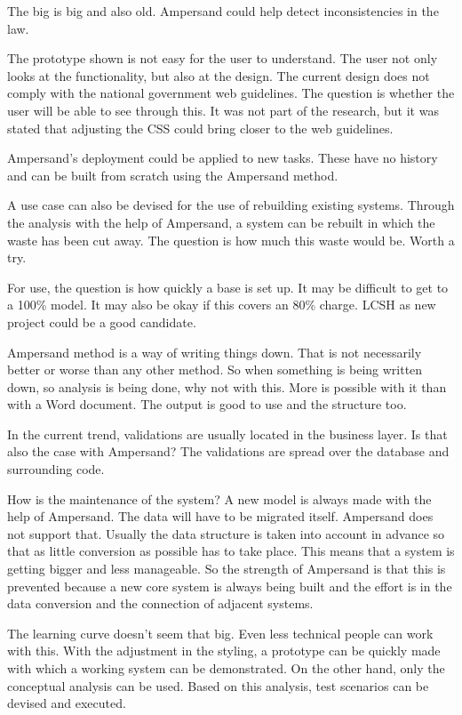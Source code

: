 The \acrshort{big} is big and also old. 
Ampersand could help detect inconsistencies in the law.

The prototype shown is not easy for the user to understand. 
The user not only looks at the functionality, but also at the design.
The current design does not comply with the national government web guidelines.
The question is whether the user will be able to see through this. 
It was not part of the research, but it was stated that adjusting the CSS could bring closer to the web guidelines.

Ampersand's deployment could be applied to new tasks. 
These have no history and can be built from scratch using the Ampersand method.

A use case can also be devised for the use of rebuilding existing systems. 
Through the analysis with the help of Ampersand, a system can be rebuilt in which the waste has been cut away. 
The question is how much this waste would be. Worth a try.

For use, the question is how quickly a base is set up. 
It may be difficult to get to a 100\% model. 
It may also be okay if this covers an 80\% charge.
LCSH as new project could be a good candidate.

Ampersand method is a way of writing things down. 
That is not necessarily better or worse than any other method. 
So when something is being written down, so analysis is being done, why not with this. 
More is possible with it than with a Word document. 
The output is good to use and the structure too.

In the current trend, validations are usually located in the business layer.
Is that also the case with Ampersand? 
The validations are spread over the database and surrounding code.

How is the maintenance of the system? 
A new model is always made with the help of Ampersand. 
The data will have to be migrated itself. 
Ampersand does not support that. 
Usually the data structure is taken into account in advance so that as little conversion as possible has to take place. 
This means that a system is getting bigger and less manageable. 
So the strength of Ampersand is that this is prevented because a new core system is always being built and the effort is in the data conversion and the connection of adjacent systems.

The learning curve doesn't seem that big. 
Even less technical people can work with this. 
With the adjustment in the styling, a prototype can be quickly made with which a working system can be demonstrated. 
On the other hand, only the conceptual analysis can be used. 
Based on this analysis, test scenarios can be devised and executed.

